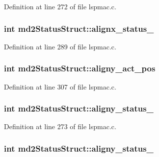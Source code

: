 Definition at line 272 of file lspmac.\-c.

\hypertarget{structmd2StatusStruct_a2feb35ceab8129fd2cc34d1104af8b8f}{
\subsubsection[{alignx\-\_\-status\-\_\-2}]{\setlength{\rightskip}{0pt plus 5cm}int md2\-Status\-Struct\-::alignx\-\_\-status\-\_}}\label{structmd2StatusStruct_a2feb35ceab8129fd2cc34d1104af8b8f}


Definition at line 289 of file lspmac.\-c.

\hypertarget{structmd2StatusStruct_a0d40a01d2aa93c443526e826440f77fc}{
\subsubsection[{aligny\-\_\-act\-\_\-pos}]{\setlength{\rightskip}{0pt plus 5cm}int md2\-Status\-Struct\-::aligny\-\_\-act\-\_\-pos}}\label{structmd2StatusStruct_a0d40a01d2aa93c443526e826440f77fc}


Definition at line 307 of file lspmac.\-c.

\hypertarget{structmd2StatusStruct_a2f2a11fe2fc7a446323def2be465185a}{
\subsubsection[{aligny\-\_\-status\-\_\-1}]{\setlength{\rightskip}{0pt plus 5cm}int md2\-Status\-Struct\-::aligny\-\_\-status\-\_}}\label{structmd2StatusStruct_a2f2a11fe2fc7a446323def2be465185a}


Definition at line 273 of file lspmac.\-c.

\hypertarget{structmd2StatusStruct_a1f98d8b9831e32d77129f9b0f1d7d255}{
\subsubsection[{aligny\-\_\-status\-\_\-2}]{\setlength{\rightskip}{0pt plus 5cm}int md2\-Status\-Struct\-::aligny\-\_\-status\-\_}}\label{structmd2StatusStruct_a1f98d8b9831e32d77129f9b0f1d7d255}


